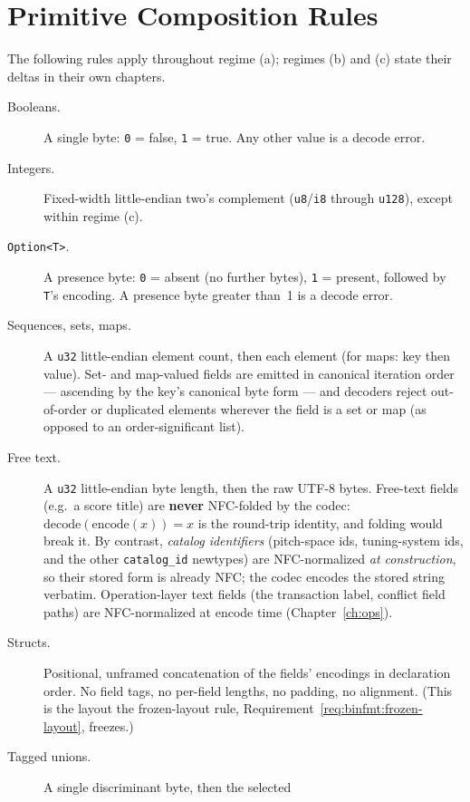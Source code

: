 \documentclass[11pt,letterpaper]{report}
\begin{document}
\section{Primitive Composition Rules}
\label{sec:conventions:primitives}

The following rules apply throughout regime (a); regimes (b) and (c) state
their deltas in their own chapters.

\begin{description}
  \item[Booleans.] A single byte: \texttt{0} = false, \texttt{1} = true. Any
    other value is a decode error.
  \item[Integers.] Fixed-width little-endian two's complement
    (\texttt{u8}/\texttt{i8} through \texttt{u128}), except within regime (c).
  \item[\texttt{Option<T>}.] A presence byte: \texttt{0} = absent (no further
    bytes), \texttt{1} = present, followed by \texttt{T}'s encoding. A
    presence byte greater than~1 is a decode error.
  \item[Sequences, sets, maps.] A \texttt{u32} little-endian element count,
    then each element (for maps: key then value). Set- and map-valued fields
    are emitted in canonical iteration order --- ascending by the key's
    canonical byte form --- and decoders reject out-of-order or duplicated
    elements wherever the field is a set or map (as opposed to an
    order-significant list).
  \item[Free text.] A \texttt{u32} little-endian byte length, then the raw
    UTF-8 bytes. Free-text fields (e.g.\ a score title) are \textbf{never}
    NFC-folded by the codec: $\mathrm{decode}(\mathrm{encode}(x)) = x$ is the
    round-trip identity, and folding would break it. By contrast,
    \emph{catalog identifiers} (pitch-space ids, tuning-system ids, and the
    other \texttt{catalog\_id} newtypes) are NFC-normalized \emph{at
    construction}, so their stored form is already NFC; the codec encodes the
    stored string verbatim. Operation-layer text fields (the transaction
    label, conflict field paths) are NFC-normalized at encode time
    (Chapter~\ref{ch:ops}).
  \item[Structs.] Positional, unframed concatenation of the fields' encodings
    in declaration order. No field tags, no per-field lengths, no padding, no
    alignment. (This is the layout the frozen-layout rule,
    Requirement~\ref{req:binfmt:frozen-layout}, freezes.)
  \item[Tagged unions.] A single discriminant byte, then the selected

\end{description}
\end{document}
